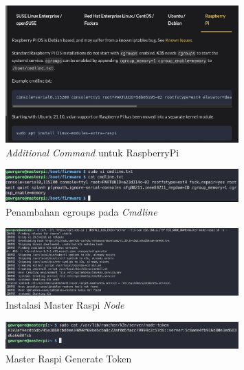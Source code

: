 \begin{figure}[ht]
  \centering
  \includegraphics[width=0.8\textwidth]{resources/chapter-4/pengujian/raspi-02-additional.jpg}
  \caption{\textit{Additional Command} untuk RaspberryPi}
  \label{fig:additional-command-raspberrypi}
\end{figure}

\begin{figure}[ht]
  \centering
  \includegraphics[width=0.8\textwidth]{resources/chapter-4/pengujian/raspi-02-additional-02.jpg}
  \caption{Penambahan cgroups pada \textit{Cmdline}}
  \label{fig:penambahan-cgroups-pada-cmdline}
\end{figure}

\begin{figure}[ht]
  \centering
  \includegraphics[width=0.8\textwidth]{resources/chapter-4/pengujian/raspi-03.jpg}
  \caption{Instalasi Master Raspi \textit{Node}}
  \label{fig:instalasi-master-raspi-nodes}
\end{figure}

\begin{figure}[ht]
  \centering
  \includegraphics[width=0.8\textwidth]{resources/chapter-4/pengujian/raspi-token-gen.jpg}
  \caption{Master Raspi Generate Token}
  \label{fig:raspi-master-gen-token}
\end{figure}

